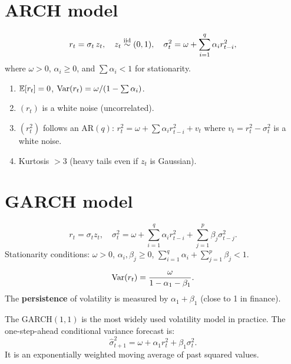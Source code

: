 \section{ARCH model}

\begin{definition}[ARCH$(q)$]
\[
r_t = \sigma_t\,z_t, \quad z_t\stackrel{\mathrm{iid}}{\sim}(0,1), \quad \sigma_t^2 = \omega + \sum_{i=1}^q\alpha_i r_{t-i}^2,
\]
where $\omega>0$, $\alpha_i\geq 0$, and $\sum\alpha_i<1$ for stationarity.
\end{definition}

\begin{theorem}
\begin{enumerate}
\item $\mathbb{E}[r_t]=0$, $\operatorname{Var}(r_t)=\omega/(1-\sum\alpha_i)$.
\item $(r_t)$ is a white noise (uncorrelated).
\item $(r_t^2)$ follows an AR$(q)$: $r_t^2 = \omega+\sum\alpha_i r_{t-i}^2+v_t$ where $v_t=r_t^2-\sigma_t^2$ is a white noise.
\item Kurtosis $>3$ (heavy tails even if $z_t$ is Gaussian).
\end{enumerate}
\end{theorem}

\section{GARCH model}

\begin{definition}[GARCH$(p,q)$]
\[
r_t = \sigma_t z_t, \quad \sigma_t^2 = \omega + \sum_{i=1}^q\alpha_i r_{t-i}^2 + \sum_{j=1}^p\beta_j\sigma_{t-j}^2.
\]
Stationarity conditions: $\omega>0$, $\alpha_i,\beta_j\geq 0$, $\sum_{i=1}^q\alpha_i+\sum_{j=1}^p\beta_j<1$.
\end{definition}

\begin{theorem}
\[
\operatorname{Var}(r_t) = \frac{\omega}{1-\alpha_1-\beta_1}.
\]
The \textbf{persistence} of volatility is measured by $\alpha_1+\beta_1$ (close to 1 in finance).
\end{theorem}

\begin{intuition}
The GARCH$(1,1)$ is the most widely used volatility model in practice. The one-step-ahead conditional variance forecast is:
\[
\hat{\sigma}_{t+1}^2 = \omega + \alpha_1 r_t^2 + \beta_1\sigma_t^2.
\]
It is an exponentially weighted moving average of past squared values.
\end{intuition}

